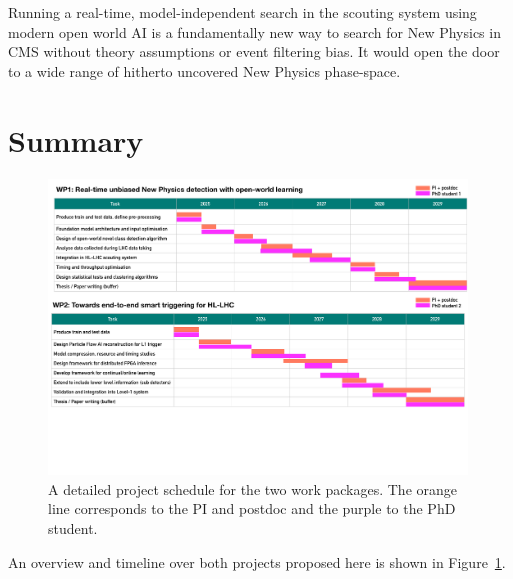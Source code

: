 \documentclass[12pt]{iopart}
\begin{document}
Running a real-time, model-independent search in the scouting system using modern open world AI is a fundamentally new way to search for New Physics in CMS without theory assumptions or event filtering bias. It would open the door to a wide range of hitherto uncovered New Physics phase-space.

\section{Summary}
\begin{figure}[bht!]
    \centering
    \includegraphics[width=0.99\textwidth]{figures/GanntChart_SG.pdf}
    \caption{A detailed project schedule for the two work packages. The orange line corresponds to the PI and postdoc and the purple to the PhD student.}
    \label{fig:gannt}
\end{figure}
An overview and timeline over both projects proposed here is shown in Figure~\ref{fig:gannt}.
\end{document}
